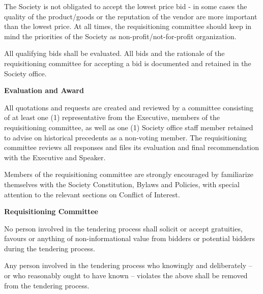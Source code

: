 \begin{longenum}[label*=\thesection.\arabic*., align=left]
\begin{longenum} [label*=\arabic*., align=left]
		\item The Society is not obligated to accept the lowest price bid - in some cases the quality of the product/goods or the reputation of the vendor are more important than the lowest price. At all times, the requisitioning committee should keep in mind the priorities of the Society as non-profit/not-for-profit organization.
		
		\item All qualifying bids shall be evaluated. All bids and the rationale of the requisitioning committee for accepting a bid is documented and retained in the Society office.
\end{longenum}

\item \textbf{Evaluation and Award}

\begin{longenum} [label*=\arabic*., align=left]
		\item All quotations and requests are created and reviewed by a committee consisting of at least one (1) representative from the Executive, members of the requisitioning committee, as well as one (1) Society office staff member retained to advise on historical precedents as a non-voting member. The requisitioning committee reviews all responses and files its evaluation and final recommendation with the Executive and Speaker. 
		
		\item Members of the requisitioning committee are strongly encouraged by familiarize themselves with the Society Constitution, Bylaws and Policies, with special attention to the relevant sections on Conflict of Interest.
		
\end{longenum}

\item \textbf{Requisitioning Committee}

\begin{longenum} [label*=\arabic*., align=left]
		\item No person involved in the tendering process shall solicit or accept gratuities, favours or anything of non-informational value from bidders or potential bidders during the tendering process. 
		
		\item Any person involved in the tendering process who knowingly and deliberately – or who reasonably ought to have known – violates the above shall be removed from the tendering process. 
		

\end{longenum}
\end{longenum}
